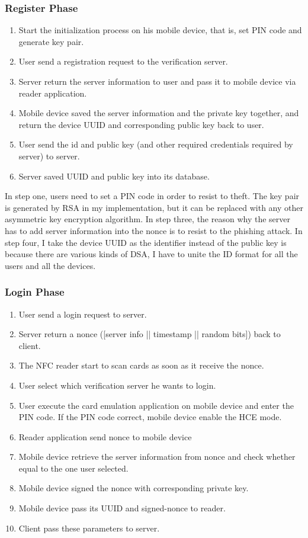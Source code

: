 \begin{CJK}{Bg5}{bsmi}
\subsubsection{Register Phase}

\begin{enumerate}
\item Start the initialization process on his mobile device, that is, set PIN code and generate key pair.
\item User send a registration request to the verification server.
\item Server return the server information to user and pass it to mobile device via reader application.
\item Mobile device saved the server information and the private key together, and return the device UUID and corresponding public key back to user.
\item User send the id and public key (and other required credentials required by server) to server.
\item Server saved UUID and public key into its database.
\end{enumerate}

In step one, users need to set a PIN code in order to resist to theft. The key pair is generated by RSA in my implementation, but it can be replaced with any other asymmetric key encryption algorithm. In step three, the reason why the server has to add server information into the nonce is to resist to the phishing attack. In step four, I take the device UUID as the identifier instead of the public key is because there are various kinds of DSA, I have to unite the ID format for all the users and all the devices.

\subsubsection{Login Phase}

\begin{enumerate}
\item User send a login request to server.
\item Server return a nonce ([server info || timestamp || random bits]) back to client.
\item The NFC reader start to scan cards as soon as it receive the nonce.
\item User select which verification server he wants to login.
\item User execute the card emulation application on mobile device and enter the PIN code. If the PIN code correct, mobile device enable the HCE mode.
\item Reader application send nonce to mobile device
\item Mobile device retrieve the server information from nonce and check whether equal to the one user selected.
\item Mobile device signed the nonce with corresponding private key.
\item Mobile device pass its UUID and signed-nonce to reader.
\item Client pass these parameters to server.
\end{enumerate}


\end{CJK}
